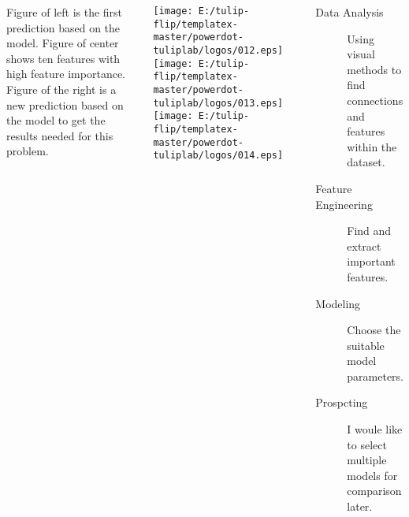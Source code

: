 \documentclass{tikzposter} %
\begin{document}
\begin{columns}
{
  Figure of left is the first prediction based on the model. Figure of center
shows ten features with high feature importance. Figure of the right is a new
prediction based on the model to get the results needed for this problem.
\vspace{2cm}
  \begin{center}
    \texttt{[image: E:/tulip-flip/templatex-master/powerdot-tuliplab/logos/012.eps]}
    \quad\texttt{[image: E:/tulip-flip/templatex-master/powerdot-tuliplab/logos/013.eps]}
    \quad\texttt{[image: E:/tulip-flip/templatex-master/powerdot-tuliplab/logos/014.eps]}	
  \end{center}
}


{
  \begin{description}
    \item[Data Analysis] Using visual methods to find connections and features within the dataset.
    \item[Feature Engineering] Find and extract important features. 
    \item[Modeling] Choose the suitable model parameters.
    \item[Prospcting] I woule like to select multiple models for comparison later.
  \end{description}
}





\end{columns}
\end{document}
